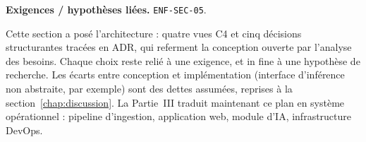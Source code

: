 \textbf{Exigences / hypothèses liées.} \texttt{ENF-SEC-05}.

Cette section a posé l'architecture : quatre vues C4 et cinq décisions structurantes tracées en ADR, qui referment la conception ouverte par l'analyse des besoins. Chaque choix reste relié à une exigence, et in fine à une hypothèse de recherche. Les écarts entre conception et implémentation (interface d'inférence non abstraite, par exemple) sont des dettes assumées, reprises à la section~\ref{chap:discussion}. La Partie~III traduit maintenant ce plan en système opérationnel : pipeline d'ingestion, application web, module d'IA, infrastructure DevOps.
